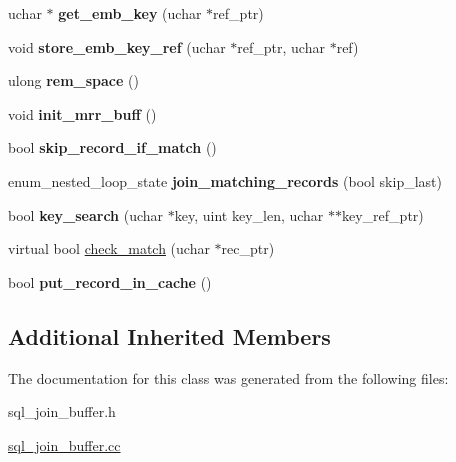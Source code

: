 \begin{DoxyCompactItemize}
\mbox{\label{classJOIN__CACHE__BKA__UNIQUE_a7bdced8c81c06e73b62fd519bced0b25}} 
uchar $\ast$ {\bfseries get\+\_\+emb\+\_\+key} (uchar $\ast$ref\+\_\+ptr)
\item 
\mbox{\label{classJOIN__CACHE__BKA__UNIQUE_af15a6d8d942865ee35d0a9331d8f027e}} 
void {\bfseries store\+\_\+emb\+\_\+key\+\_\+ref} (uchar $\ast$ref\+\_\+ptr, uchar $\ast$ref)
\item 
\mbox{\label{classJOIN__CACHE__BKA__UNIQUE_a67f825d66ed053f86abb1dc138516f57}} 
ulong {\bfseries rem\+\_\+space} ()
\item 
\mbox{\label{classJOIN__CACHE__BKA__UNIQUE_a0004aceb528f404958fe7b6fbfd04124}} 
void {\bfseries init\+\_\+mrr\+\_\+buff} ()
\item 
bool {\bfseries skip\+\_\+record\+\_\+if\+\_\+match} ()
\item 
enum\+\_\+nested\+\_\+loop\+\_\+state {\bfseries join\+\_\+matching\+\_\+records} (bool skip\+\_\+last)
\item 
bool {\bfseries key\+\_\+search} (uchar $\ast$key, uint key\+\_\+len, uchar $\ast$$\ast$key\+\_\+ref\+\_\+ptr)
\item 
virtual bool \mbox{\hyperlink{group__Query__Optimizer_gafd031be055cee296d6629313a333b56f}{check\+\_\+match}} (uchar $\ast$rec\+\_\+ptr)
\item 
bool {\bfseries put\+\_\+record\+\_\+in\+\_\+cache} ()
\end{DoxyCompactItemize}
\subsection*{Additional Inherited Members}


The documentation for this class was generated from the following files\+:\begin{DoxyCompactItemize}
\item 
sql\+\_\+join\+\_\+buffer.\+h\item 
\mbox{\hyperlink{sql__join__buffer_8cc}{sql\+\_\+join\+\_\+buffer.\+cc}}\end{DoxyCompactItemize}
